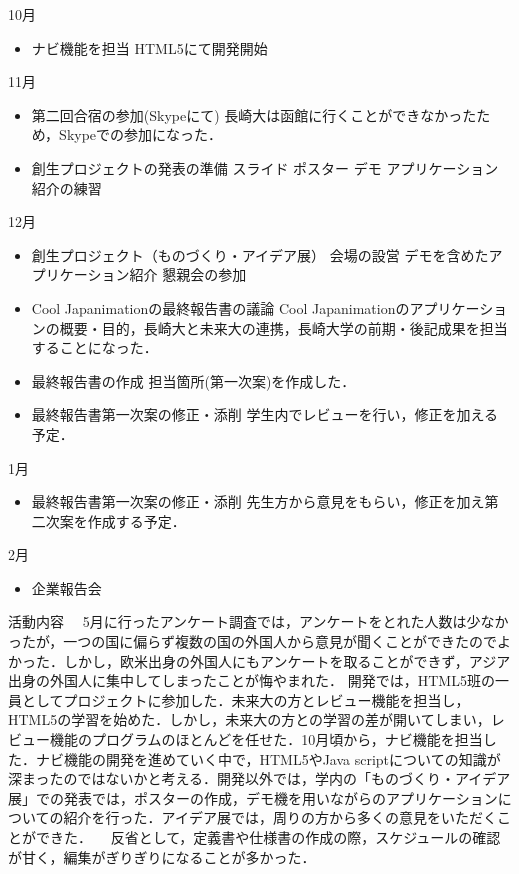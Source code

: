 \par
10月
\begin{itemize}
\item ナビ機能を担当
   HTML5にて開発開始
\end{itemize}
\par
11月
\begin{itemize}
\item 第二回合宿の参加(Skypeにて)
	長崎大は函館に行くことができなかったため，Skypeでの参加になった．
\item 創生プロジェクトの発表の準備
	スライド
	ポスター
	デモ
	アプリケーション紹介の練習
\end{itemize}
\par
12月
\begin{itemize}
\item 創生プロジェクト（ものづくり・アイデア展）
	会場の設営
	デモを含めたアプリケーション紹介
	懇親会の参加
\item Cool Japanimationの最終報告書の議論
Cool Japanimationのアプリケーションの概要・目的，長崎大と未来大の連携，長崎大学の前期・後記成果を担当することになった．
\item 最終報告書の作成
	担当箇所(第一次案)を作成した．
\item 最終報告書第一次案の修正・添削
	学生内でレビューを行い，修正を加える予定．
\end{itemize}
\par
1月
\begin{itemize}
\item 最終報告書第一次案の修正・添削
	先生方から意見をもらい，修正を加え第二次案を作成する予定．
\end{itemize}
\par
2月
\begin{itemize}
\item 企業報告会
\end{itemize}
\par
活動内容
　5月に行ったアンケート調査では，アンケートをとれた人数は少なかったが，一つの国に偏らず複数の国の外国人から意見が聞くことができたのでよかった．しかし，欧米出身の外国人にもアンケートを取ることができず，アジア出身の外国人に集中してしまったことが悔やまれた．
開発では，HTML5班の一員としてプロジェクトに参加した．未来大の方とレビュー機能を担当し，HTML5の学習を始めた．しかし，未来大の方との学習の差が開いてしまい，レビュー機能のプログラムのほとんどを任せた．10月頃から，ナビ機能を担当した．ナビ機能の開発を進めていく中で，HTML5やJava scriptについての知識が深まったのではないかと考える．開発以外では，学内の「ものづくり・アイデア展」での発表では，ポスターの作成，デモ機を用いながらのアプリケーションについての紹介を行った．アイデア展では，周りの方から多くの意見をいただくことができた．
　反省として，定義書や仕様書の作成の際，スケジュールの確認が甘く，編集がぎりぎりになることが多かった．

